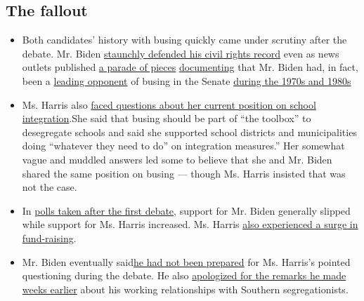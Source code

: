 \hypertarget{the-fallout}{%
\subsection{The fallout}\label{the-fallout}}

\begin{itemize}
\tightlist
\item
  Both candidates' history with busing quickly came under scrutiny after
  the debate. Mr. Biden
  \href{https://www.nytimes.com/2019/06/28/us/politics/biden-harris-debate-democratic.html}{staunchly
  defended his civil rights record} even as news outlets published
  \href{https://www.nytimes.com/2019/06/28/us/politics/biden-harris-debate-democratic.html}{a
  parade of pieces}
  \href{https://www.nytimes.com/2019/07/15/us/joe-biden-busing-timeline.html}{documenting}
  that Mr. Biden had, in fact, been a
  \href{https://www.nytimes.com/2019/06/21/us/politics/joe-biden-james-eastland.html?module=inline}{leading
  opponent} of busing in the Senate
  \href{https://www.nytimes.com/2019/06/28/us/politics/joe-biden-busing-kamala-harris.html}{during
  the 1970s and 1980s}
\end{itemize}

\begin{itemize}
\item
  Ms. Harris also
  \href{https://www.nytimes.com/2019/07/04/us/politics/joe-biden-kamala-harris-busing-iowa.html}{faced
  questions about her current position on school integration}.She said
  that busing should be part of ``the toolbox'' to desegregate schools
  and said she supported school districts and municipalities doing
  ``whatever they need to do'' on integration measures.'' Her somewhat
  vague and muddled answers led some to believe that she and Mr. Biden
  shared the same position on busing --- though Ms. Harris insisted that
  was not the case. 
\item
  In
  \href{https://www.nytimes.com/2019/07/02/us/politics/kamala-harris-polls.html}{polls
  taken after the first debate}, support for Mr. Biden generally slipped
  while support for Ms. Harris increased. Ms. Harris
  \href{https://www.nytimes.com/2019/07/05/us/politics/kamala-harris-fundraising.html}{also
  experienced a surge in fund-raising}.
\item
  Mr. Biden eventually
  said\href{https://www.nytimes.com/2019/07/05/us/politics/biden-harris-busing-cnn.html}{he
  had not been prepared} for Ms. Harris's pointed questioning during the
  debate. He also
  \href{https://www.nytimes.com/2019/07/06/us/politics/joe-biden-barack-obama-south-carolina.html}{apologized
  for the remarks he made weeks earlier} about his working relationships
  with Southern segregationists.
\end{itemize}

